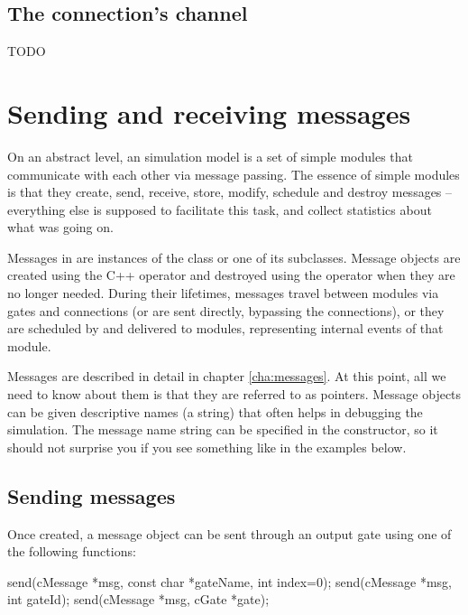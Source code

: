 \subsection{The connection's channel}

TODO


\section{Sending and receiving messages}
\label{sec:simple-modules:sending-and-receiving}

On an abstract level, an {\opp} simulation model is a set of
simple modules that communicate with each other via message passing.
The essence of simple modules is that they create, send, receive,
store, modify, schedule and destroy messages -- everything else
is supposed to facilitate this task, and collect statistics
about what was going on.

Messages in {\opp} are instances of the  class or
one of its subclasses. Message objects are created using the C++
 operator and destroyed using the  operator
when they are no longer needed. During their lifetimes,
messages travel between modules via gates and connections
(or are sent directly, bypassing the connections), or
they are scheduled by and delivered to modules,
representing internal events of that module.

Messages are described in detail in chapter \ref{cha:messages}.
At this point, all we need to know about them is that they are
referred to as  pointers. Message objects
can be given descriptive names (a  string)
that often helps in debugging the simulation. The message
name string can be specified in the constructor, so it
should not surprise you if you see something like
 in the examples below.



\subsection{Sending messages}

Once created, a message object can be sent through an
output gate using one of the following functions:

\begin{cpp}
send(cMessage *msg, const char *gateName, int index=0);
send(cMessage *msg, int gateId);
send(cMessage *msg, cGate *gate);
\end{cpp}

